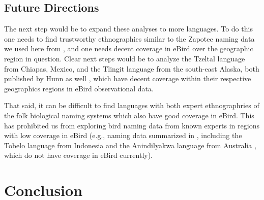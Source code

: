 \documentclass[10pt,letterpaper]{article}
\begin{document}
\subsection{Future Directions}
The next step would be to expand these analyses to more languages. To do this one needs to find trustworthy ethnographies similar to the Zapotec naming data we used here from , and one needs decent coverage in eBird over the geographic region in question. Clear next steps would be to analyze the Tzeltal language from Chiapas, Mexico, and the Tlingit language from the south-east Alaska, both published by Hunn as well \cite{hunn1977tzeltal,hunn2012tlingit}, which have decent coverage within their respective geographics regions in eBird observational data. 

That said, it can be difficult to find languages with both expert ethnographries of the folk biological naming systems which also have good coverage in eBird. This has prohibited us from exploring bird naming data from known experts in regions with low coverage in eBird (e.g., naming data summarized in \cite{holman2002relation}, including the Tobelo language from Indonesia \cite{taylor1990folk} and the Anindilyakwa language from Australia \cite{waddy1988classification}, which do not have coverage in eBird currently).

\section{Conclusion}




\end{document}

